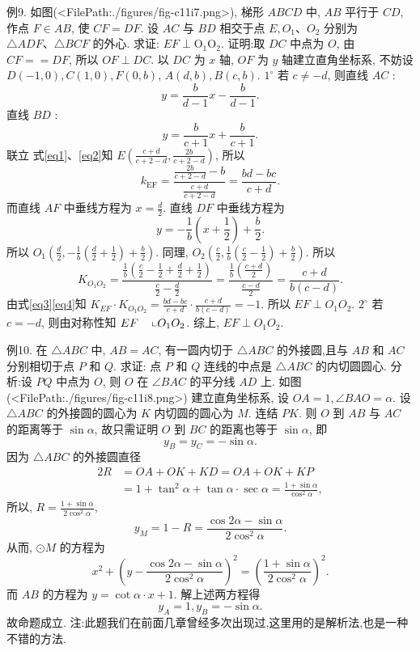 例9. 如图(<FilePath:./figures/fig-c11i7.png>), 梯形 $A B C D$ 中, $A B$ 平行于 $C D$, 作点 $F \in A B$, 使 $C F=D F$. 设 $A C$ 与 $B D$ 相交于点 $E, O_1 、 O_2$ 分别为 $\triangle A D F 、 \triangle B C F$ 的外心.
求证: $E F \perp \mathrm{O}_1 \mathrm{O}_2$.
证明:取 $D C$ 中点为 $O$, 由 $C F==D F$, 所以 $O F \perp D C$.
以 $D C$ 为 $x$ 轴, $O F$ 为 $y$ 轴建立直角坐标系, 不妨设 $D(-1,0), C(1,0), F(0, b)$, $A(d, b), B(c, b)$.
$1^{\circ}$ 若 $c \neq-d$, 则直线 $A C$ :
$$
y=\frac{b}{d-1} x-\frac{b}{d-1} . \label{eq1}
$$
直线 $B D$ :
$$
y=\frac{b}{c+1} x+\frac{b}{c+1} . \label{eq2}
$$
联立 式\ref{eq1}、\ref{eq2}知 $E\left(\frac{c+d}{c+2-d}, \frac{2 b}{c+2-d}\right)$, 所以
$$
k_{\mathrm{EF}}=\frac{\frac{2 b}{c+2-d}-b}{\frac{c+d}{c+2-d}}=\frac{b d-b c}{c+d} . \label{eq3}
$$
而直线 $A F$ 中垂线方程为 $x=\frac{d}{2}$.
直线 $D F$ 中垂线方程为
$$
y=-\frac{1}{b}\left(x+\frac{1}{2}\right)+\frac{b}{2} .
$$
所以 $O_1\left(\frac{d}{2},-\frac{1}{b}\left(\frac{d}{2}+\frac{1}{2}\right)+\frac{b}{2}\right)$.
同理, $O_2\left(\frac{c}{2}, \frac{1}{b}\left(\frac{c}{2}-\frac{1}{2}\right)+\frac{b}{2}\right)$.
所以
$$
K_{O_1 O_2}=\frac{\frac{1}{b}\left(\frac{c}{2}-\frac{1}{2}+\frac{d}{2}+\frac{1}{2}\right)}{\frac{c}{2}-\frac{d}{2}}=\frac{\frac{1}{b}\left(\frac{c+d}{2}\right)}{\frac{c-d}{2}}=\frac{c+d}{b(c-d)} . \label{eq4}
$$
由式\ref{eq3}\ref{eq4}知 $K_{E F} \cdot K_{O_1 O_2}=\frac{b d-b c}{c+d} \cdot \frac{c+d}{b(c-d)}=-1$.
所以 $E F \perp O_1 O_2$.
$2^{\circ}$ 若 $c=-d$, 则由对称性知 $E F \quad\left\llcorner O_1 O_2\right.$.
综上, $E F \perp O_1 O_2$.



例10. 在 $\triangle A B C$ 中, $A B=A C$, 有一圆内切于 $\triangle A B C$ 的外接圆,且与 $A B$ 和 $A C$ 分别相切于点 $P$ 和 $Q$. 求证: 点 $P$ 和 $Q$ 连线的中点是 $\triangle A B C$ 的内切圆圆心.
分析:设 $P Q$ 中点为 $O$, 则 $O$ 在 $\angle B A C$ 的平分线 $A D$ 上.
如图(<FilePath:./figures/fig-c11i8.png>) 建立直角坐标系, 设 $O A=1, \angle B A O=\alpha$. 设 $\triangle A B C$ 的外接圆的圆心为 $K$ 内切圆的圆心为 $M$. 连结 $P K$. 则 $O$ 到 $A B$ 与 $A C$ 的距离等于 $\sin \alpha$, 故只需证明 $O$ 到 $B C$ 的距离也等于 $\sin \alpha$, 即
$$
y_B=y_C=-\sin \alpha .
$$
因为 $\triangle A B C$ 的外接圆直径
$$
\begin{aligned}
2 R & =O A+O K+K D=O A+O K+K P \\
& =1+\tan ^2 \alpha+\tan \alpha \cdot \sec \alpha=\frac{1+\sin \alpha}{\cos ^2 \alpha},
\end{aligned}
$$
所以, $R=\frac{1+\sin \alpha}{2 \cos ^2 \alpha}$,
$$
y_M=1-R=\frac{\cos 2 \alpha-\sin \alpha}{2 \cos ^2 \alpha} .
$$
从而, $\odot M$ 的方程为
$$
x^2+\left(y-\frac{\cos 2 \alpha-\sin \alpha}{2 \cos ^2 \alpha}\right)^2=\left(\frac{1+\sin \alpha}{2 \cos ^2 \alpha}\right)^2 .
$$
而 $A B$ 的方程为 $y=\cot \alpha \cdot x+1$.
解上述两方程得
$$
y_A=1, y_B=-\sin \alpha .
$$
故命题成立.
注:此题我们在前面几章曾经多次出现过,这里用的是解析法,也是一种不错的方法.



